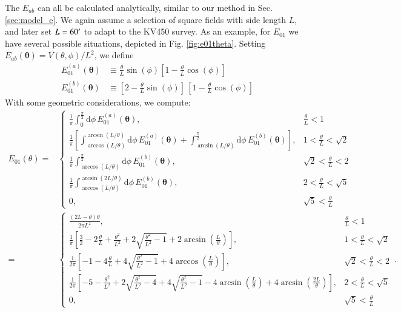 \documentclass{aa}
\renewcommand{\rm}{\mathrm}
\def\b#1{\bm{#1}}
\def\d{\rm{d}}
\begin{document}
\begin{appendix}
The $E_{ab}$ can all be calculated analytically, similar to our method in Sec. \ref{sec:model_e}. We again assume a selection of square fields with side length $L$, and later set $L=60^\prime$ to adapt to the KV450 survey. As an example, for $E_{01}$ we have several possible situations, depicted in Fig. \ref{fig:e01theta}. Setting $E_{ab}(\b\theta) = V(\theta,\phi)/L^2$, we define \begin{align}
E_{01}^{(a)}(\b\theta) & \equiv \frac{\theta}{L}\sin(\phi)\left[1-\frac{\theta}{L}\cos(\phi)\right] \nonumber\\
E_{01}^{(b)}(\b\theta) & \equiv \left[2-\frac{\theta}{L}\sin(\phi)\right]\, \left[1-\frac{\theta}{L}\cos(\phi)\right]
\end{align}
With some geometric considerations, we compute:
{
\begingroup
\addtolength{\jot}{1em}
\begin{align}
E_{01}(\theta) = & \begin{cases}
\frac{1}{\pi}\int_0^{\frac{\pi}{2}} \d\phi\, E_{01}^{(a)}(\b\theta), & \frac{\theta}{L} < 1 \\[10pt]
 \frac{1}{\pi}  \left[\int_{\arccos(L/\theta)}^{\arcsin(L/\theta)}\d\phi\,E_{01}^{(a)}(\b\theta) + \int_{\arcsin(L/\theta)}^{\frac{\pi}{2}}\d\phi\, E_{01}^{(b)}(\b\theta) \right],  & 1 < \frac{\theta}{L} < \sqrt{2} \\[10pt]
 \frac{1}{\pi} \int_{\arccos(L/\theta)}^{\frac{\pi}{2}}\d\phi\, E_{01}^{(b)}(\b\theta), & \sqrt{2}<\frac{\theta}{L}<2 \\[10pt]
\frac{1}{\pi} \int_{\arccos(L/\theta)}^{\arcsin(2L/\theta)}\d\phi\, E_{01}^{(b)}(\b\theta), & 2<\frac{\theta}{L}<\sqrt{5} \\[10pt]
 0, & \sqrt{5}<\frac{\theta}{L}
\end{cases}\nonumber\\
 = & \begin{cases}
 \frac{(2L-\theta)\theta}{2\pi L^2}, & \frac{\theta}{L} < 1 \\[10pt]
 \frac{1}{\pi}\left[\frac{3}{2}- 2\frac{\theta}{L}+\frac{\theta^2}{L^2}+2\sqrt{\frac{\theta^2}{L^2}-1}+2\arcsin\left(\frac{L}{\theta}\right)\right], & 1<\frac{\theta}{L}<\sqrt{2} \\[10pt]
 \frac{1}{2\pi}\left[-1-4\frac{\theta}{L}+4\sqrt{\frac{\theta^2}{L^2}-1}+4\arccos\left(\frac{L}{\theta}\right)\right], & \sqrt{2} < \frac{\theta}{L} < 2 \\[10pt]
 \frac{1}{2\pi}\left[-5-\frac{\theta^2}{L^2}+2\sqrt{\frac{\theta^2}{L^2}-4}+4\sqrt{\frac{\theta^2}{L^2}-1}-4\arcsin\left(\frac{L}{\theta}\right)+4\arcsin\left(\frac{2L}{\theta}\right)\right], & 2 < \frac{\theta}{L} < \sqrt{5} \\[10pt]
 0, & \sqrt{5}<\frac{\theta}{L}
 \end{cases}\, .
\end{align}
\endgroup
}


\end{appendix}
\end{document}
